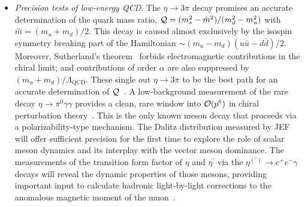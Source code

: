 \begin{itemize}
\item {\em Precision tests of low-energy QCD}. The $\eta \rightarrow
  3\pi$ decay promises an accurate determination of the quark mass
  ratio, $ {\cal Q} =(m_s^2-\hat{m}^2)/(m_d^2-m_u^2)$ with $\hat{m} =
  (m_u+m_d)/2$. This decay is caused almost exclusively by the isospin
  symmetry breaking part of the Hamiltonian $\sim (m_u-m_d)(u{\bar
    u}-d{\bar d})/2$.  Moreover, Sutherland's
  theorem~\cite{Bell:1968,Sutherland:1966} forbids electromagnetic
  contributions in the chiral limit; and contributions of order
  $\alpha$ are also suppressed by $(m_u+m_d)/\Lambda_\mathrm{QCD}$.
  These single out $\eta\rightarrow 3\pi$ to be the best path for an
  accurate determination of ${\cal Q}$~\cite{Leutwyler:1996,
    Bijnens:2001, Colangelo:2018jxw}.  A low-background measurement of
  the rare decay $\eta \rightarrow \pi^0 \gamma\gamma$ provides a
  clean, rare window into ${\cal O}(p^6)$ in chiral perturbation
  theory~\cite{Bijnens:1992}. This is the only known meson decay that
  proceeds via a polarizability-type mechanism. The Dalitz
  distribution measured by JEF will offer sufficient precision for the
  first time to explore the role of scalar meson dynamics and its
  interplay with the vector meson dominance. The measurements of the
  transition form factor of $\eta$ and $\eta^{\prime}$ via the
  $\eta^{(\prime)}\rightarrow e^+e^-\gamma$ decays will reveal the
  dynamic properties of those mesons, providing important input to
  calculate hadronic light-by-light corrections to the anomalous
  magnetic moment of the muon~\cite{Aoyama:2020ynm}.


\end{itemize}
